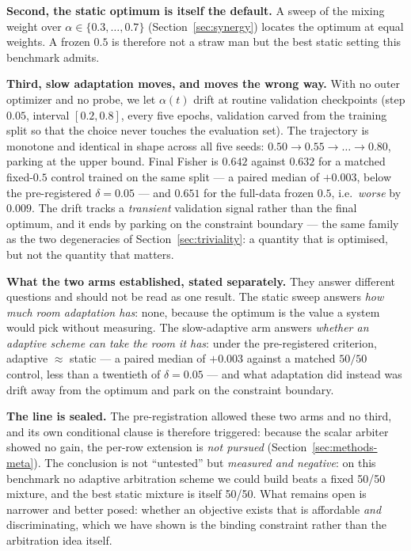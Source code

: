 \documentclass[11pt]{article}
\begin{document}
\textbf{Second, the static optimum is itself the default.} A sweep of the mixing weight over
$\alpha \in \{0.3, \dots, 0.7\}$ (Section~\ref{sec:synergy}) locates the optimum at equal
weights. A frozen $0.5$ is therefore not a straw man but the best static setting this benchmark
admits.

\textbf{Third, slow adaptation moves, and moves the wrong way.} With no outer optimizer and no
probe, we let $\alpha(t)$ drift at routine validation checkpoints (step $0.05$, interval
$[0.2, 0.8]$, every five epochs, validation carved from the training split so that the choice
never touches the evaluation set). The trajectory is monotone and identical in shape across all
five seeds: $0.50 \to 0.55 \to \dots \to 0.80$, parking at the upper bound. Final Fisher is
$0.642$ against $0.632$ for a matched fixed-$0.5$ control trained on the same split --- a paired
median of $+0.003$, below the pre-registered $\delta = 0.05$ --- and $0.651$ for the full-data
frozen $0.5$, i.e.\ \emph{worse} by $0.009$. The drift tracks a \emph{transient} validation
signal rather than the final optimum, and it ends by parking on the constraint boundary --- the
same family as the two degeneracies of Section~\ref{sec:triviality}: a quantity that is
optimised, but not the quantity that matters.

\textbf{What the two arms established, stated separately.} They answer different questions and
should not be read as one result. The static sweep answers \emph{how much room adaptation has}:
none, because the optimum is the value a system would pick without measuring. The slow-adaptive arm
answers \emph{whether an adaptive scheme can take the room it has}: under the pre-registered
criterion, adaptive $\approx$ static --- a paired median of $+0.003$ against a matched
$50/50$ control, less than a twentieth of $\delta = 0.05$ --- and what adaptation did instead
was drift away from the optimum and park on the constraint boundary.

\textbf{The line is sealed.} The pre-registration allowed these two arms and no third, and its
own conditional clause is therefore triggered: because the scalar arbiter showed no gain, the
per-row extension is \emph{not pursued} (Section~\ref{sec:methods-meta}). The conclusion is not
``untested'' but \emph{measured and negative}: on this benchmark no adaptive arbitration scheme we
could build beats a fixed 50/50 mixture, and the best static mixture is itself 50/50. What remains
open is narrower and better posed: whether an objective exists that is affordable \emph{and}
discriminating, which we have shown is the binding constraint rather than the arbitration idea
itself.
\end{document}
